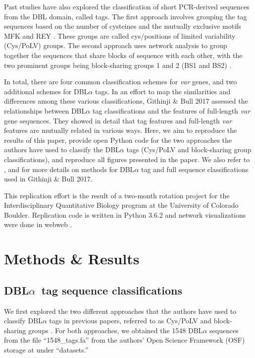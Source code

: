 \documentclass[10pt,twocolumn,superscriptaddress]{revtex4-1}
\newcommand{\var}{{\it var}\xspace}
\newcommand{\dbla}{{DBL$\alpha$}\xspace}
\newcommand{\cp}{{Cys/PoLV}\xspace}
\newcommand{\paper}{{Githinji \& Bull 2017}\xspace}
\begin{document}
Past studies have also explored the classification of short PCR-derived sequences from the DBL domain, called tags. The first approach involves grouping the tag sequences based on the number of cysteines and the mutually exclusive motifs MFK and REY \cite{bull2007}. These groups are called cys/positions of limited variability (\cp) groups. The second approach uses network analysis to group together the sequences that share blocks of sequence with each other, with the two prominent groups being block-sharing groups 1 and 2 (BS1 and BS2) \cite{bull2008}.  

In total, there are four common classification schemes for \var genes, and two additional schemes for \dbla tags. In an effort to map the similarities and differences among these various classifications, \paper \cite{githinji2017} assessed the relationships between \dbla tag classifications and the features of full-length \var gene sequences. They showed in detail that tag features and full-length \var features are mutually related in various ways. Here, we aim to reproduce the results of this paper, provide open Python code \cite{github} for the two approaches the authors have used to classify the \dbla tags (\cp and block-sharing group classifications), and reproduce all figures presented in the paper. We also refer to \cite{bull2008}, \cite{bull2007} and \cite{rask2010} for more details on methods for \dbla tag and full sequence classifications used in \paper \cite{githinji2017}. 

This replication effort is the result of a two-month rotation project for the Interdisciplinary Quantitative Biology program at the University of Colorado Boulder. Replication code is written in Python 3.6.2 \cite{github} and network visualizations were done in webweb \cite{webweb}. 


\section{Methods \& Results}

\subsection{\dbla\ tag sequence classifications}
We first explored the two different approaches that the authors have used to classify \dbla tags in previous papers, referred to as \cp \cite{bull2007} and block-sharing groups \cite{bull2008}. For both approaches, we obtained the 1548 \dbla sequences from the file ``1548\_tags.fa'' from the authors' Open Science Framework (OSF) storage at  under ``datasets.''  
\end{document}
